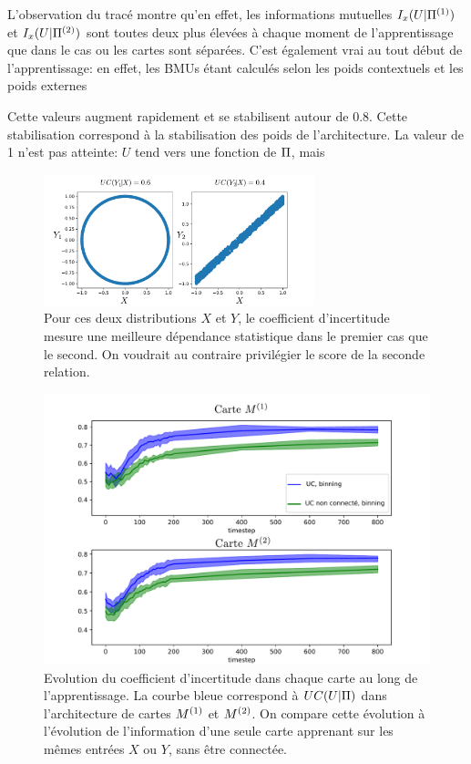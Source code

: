L'observation du tracé montre qu'en effet, les informations mutuelles $I_x(U|\Pi^{({1})})$ et $I_x(U|\Pi^{({2})})$ sont toutes deux plus élevées à chaque moment de l'apprentissage que dans le cas ou les cartes sont séparées. C'est également vrai au tout début de l'apprentissage: en effet, les BMUs étant calculés selon les poids contextuels et les poids externes

Cette valeurs augment rapidement et se stabilisent autour de 0.8. Cette stabilisation correspond à la stabilisation des poids de l'architecture. La valeur de 1 n'est pas atteinte: $U$ tend vers une fonction de $\Pi$, mais 

\begin{figure}
\centering
\includegraphics[width=0.7\textwidth]{exemple_limite.pdf}
\caption{Pour ces deux distributions $X$ et $Y$, le coefficient d'incertitude mesure une meilleure dépendance statistique dans le premier cas que le second. On voudrait au contraire privilégier le score de la seconde relation.}
\label{fig:exemple-limite}
\end{figure}


\begin{figure}
\includegraphics[width=\textwidth]{evolution_MI_binning}
\caption{Evolution du coefficient d'incertitude dans chaque carte au long de l'apprentissage. La courbe bleue correspond à $UC(U|\Pi)$ dans l'architecture de cartes $M^{({1})}$ et $M^{({2})}$. On compare cette évolution à l'évolution de l'information d'une seule carte apprenant sur les mêmes entrées $X$ ou $Y$, sans être connectée.}
\label{fig:MI_evol}
\end{figure}

